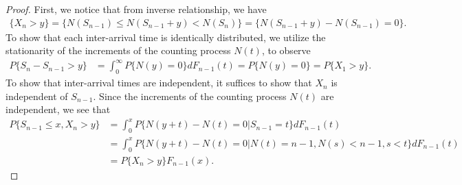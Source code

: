 \documentclass[a4paper,10pt,english]{article}
\begin{document}
\begin{proof} 
First, we notice that from inverse relationship, we have 
\begin{align*}
\{X_{n} > y\} = \{ N(S_{n-1}) \le N(S_{n-1} + y) < N(S_{n})\} = \{N(S_{n-1}+y)-N(S_{n-1}) = 0\}. 
\end{align*}
To show that each inter-arrival time is identically distributed, we utilize the stationarity of the increments of the counting process $N(t)$, to observe 
\begin{align*}
P\{S_n - S_{n-1} > y\} &%
= \int_{0}^{\infty}P\{N(y) = 0\}dF_{n-1}(t) = P\{N(y) = 0\} = P\{X_1 > y\}.
\end{align*}
To show that inter-arrival times are independent, it suffices to show that $X_{n}$ is independent of $S_{n-1}$. 
Since the increments of the counting process $N(t)$ are independent, we see that 
\begin{align*}
P\{S_{n-1} \le x, X_{n} > y\} &%
= \int_{0}^{x}P\{N(y+t) - N(t) = 0|S_{n-1} = t\}dF_{n-1}(t)\\
&= \int_{0}^{x}P\{N(y+t) - N(t) = 0|N(t) = n-1, N(s) < n-1, s < t \}dF_{n-1}(t) \\
&= P\{X_n > y\}F_{n-1}(x).
\end{align*}

\end{proof}
\end{document}
